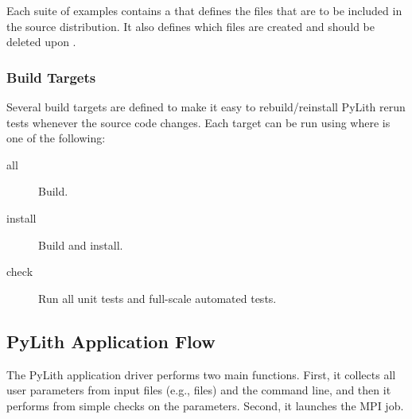 Each suite of examples contains a  that defines
the files that are to be included in the source distribution. It also
defines which files are created and should be deleted upon
.

\subsubsection{Build Targets}

Several build targets are defined to make it easy to rebuild/reinstall
PyLith rerun tests whenever the source code changes. Each target can
be run using  where  is
one of the following:

\begin{description}
\item[all] Build.
\item[install] Build and install.
\item[check] Run all unit tests and full-scale automated tests.
\end{description}


\subsection{PyLith Application Flow}

The PyLith application driver performs two main functions. First, it
collects all user parameters from input files (e.g., 
files) and the command line, and then it performs from simple checks
on the parameters. Second, it launches the MPI job.

